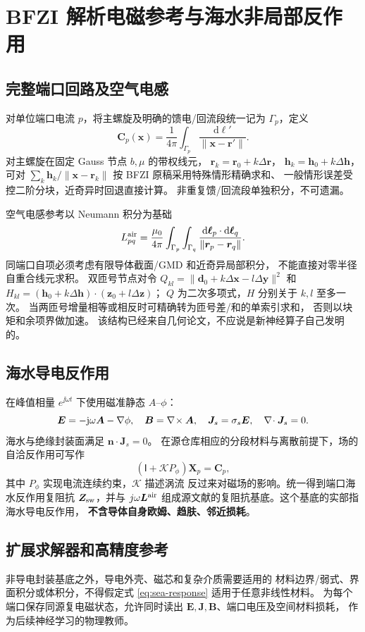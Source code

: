 \section{BFZI 解析电磁参考与海水非局部反作用}\label{sec:em}
\subsection{完整端口回路及空气电感}
对单位端口电流 \(p\)，将主螺旋及明确的馈电/回流段统一记为
\(\Gamma_p\)，定义
\[
\bm C_p(\bm x)=\frac1{4\pi}
\int_{\Gamma_p}\frac{\mathrm d\bm\ell'}{\|\bm x-\bm r'\|}.
\]
对主螺旋在固定 Gauss 节点 \(b,\mu\) 的带权线元，
\(\bm r_k=\bm r_0+k\Delta\bm r\)，
\(\bm h_k=\bm h_0+k\Delta\bm h\)，
可对 \(\sum_k\bm h_k/\|\bm x-\bm r_k\|\)
按 BFZI 原稿采用特殊情形精确求和、
一般情形误差受控二阶分块，近奇异时回退直接计算。
非重复馈/回流段单独积分，不可遗漏。

空气电感参考以 Neumann 积分为基础
\[
L^{\rm air}_{pq}=\frac{\mu_0}{4\pi}
\int_{\Gamma_p}\int_{\Gamma_q}
\frac{\mathrm d\bm\ell_p\cdot\mathrm d\bm\ell_q}
{\|\bm r_p-\bm r_q\|}.
\]
同端口自项必须考虑有限导体截面/GMD 和近奇异局部积分，
不能直接对零半径自重合线元求积。
双匝号节点对令
\(Q_{kl}=\|\bm d_0+k\Delta\bm x-l\Delta\bm y\|^2\) 和
\(H_{kl}=(\bm h_0+k\Delta\bm h)\cdot(\bm z_0+l\Delta\bm z)\)；
\(Q\) 为二次多项式，\(H\) 分别关于 \(k,l\) 至多一次。
当两匝号增量相等或相反时可精确转为匝号差/和的单索引求和，
否则以块矩和余项界做加速。
该结构已经来自几何论文，不应说是新神经算子自己发明的。

\subsection{海水导电反作用}
在峰值相量 \(e^{\jj\omega t}\) 下使用磁准静态 \(A\)--\(\phi\)：
\begin{equation}
\bm E=-\mathrm j\omega\bm A-\nabla\phi,\quad
\bm B=\nabla\!\times\bm A,\quad
\bm J_s=\sigma_s\bm E,\quad \nabla\!\cdot\bm J_s=0.
\end{equation}
海水与绝缘封装面满足 \(\bm n\cdot\bm J_s=0\)。
在源仓库相应的分段材料与离散前提下，场的自洽反作用可写作
\begin{equation}
\boxed{(\mathsf I+\mathcal KP_\phi)\bm X_p=\bm C_p},
\label{eq:sea-response}
\end{equation}
其中 \(P_\phi\) 实现电流连续约束，\(\mathcal K\) 描述涡流
反过来对磁场的影响。统一得到端口海水反作用复阻抗
\(\bm Z_{\rm sw}\)，并与 \(j\omega\bm L^{\rm air}\)
组成源文献的复阻抗基底。这个基底的实部指海水导电反作用，
\textbf{不含导体自身欧姆、趋肤、邻近损耗}。

\subsection{扩展求解器和高精度参考}
非导电封装基底之外，导电外壳、磁芯和复杂介质需要适用的
材料边界/弱式、界面积分或体积分，不得假定式
\eqref{eq:sea-response} 适用于任意非线性材料。
为每个端口保存同源复电磁状态，允许同时读出
\(\bm E,\bm J,\bm B\)、端口电压及空间材料损耗，
作为后续神经学习的物理教师。

